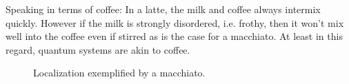 
Speaking in terms of coffee: In a latte, the milk and coffee always intermix quickly. However if the milk is strongly
disordered, i.e. frothy, then it won't mix well into the coffee even if stirred  as is the case for a macchiato. At least in this regard, quantum systems are akin to coffee.

\begin{figure}[hbt]
	\centering
	\hfil
	\hfil
	\raisebox{-0.5\height}{\scalebox{4}{$\longrightarrow$}}
	\hfil
	\hfil
	\caption{Localization exemplified by a macchiato.}
	\label{fig:localized-macciato}
\end{figure}

%
%

